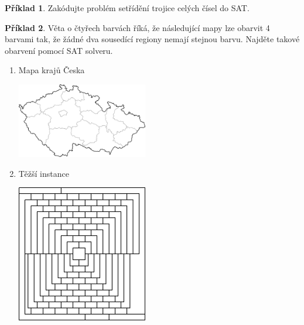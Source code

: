 \documentclass[a4paper]{article}
\theoremstyle{definition}
\newtheorem{problem}{Příklad}
\begin{document}
    
\medskip\begin{problem}
    Zakódujte problém setřídění trojice celých čísel do SAT.
\end{problem}
    
        
\medskip\begin{problem}
Věta o čtyřech barvách říká, že následující mapy lze obarvit 4 barvami tak, že žádné dva sousedící regiony nemají stejnou barvu. Najděte takové obarvení pomocí SAT solveru.
\begin{multicols}{2}
\begin{enumerate}
    \item Mapa krajů Česka  
    
    \vfill \includegraphics[width=0.45\textwidth]{files/map-coloring-czechia.png} \vfill
    
    \item Těžší instance  
    
    \vfill \includegraphics[width=0.45\textwidth]{files/map-coloring-hard.png} \vfill
\end{enumerate}
\end{multicols}
\end{problem}
\end{document}
